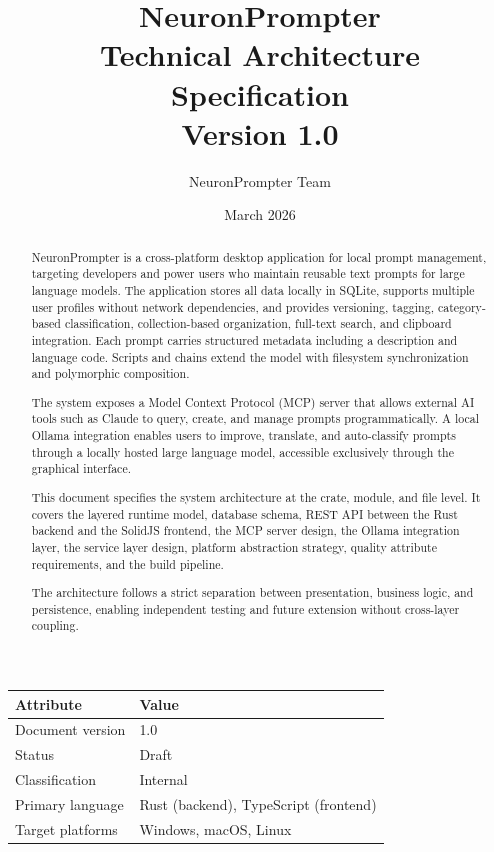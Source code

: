 \documentclass[a4paper, 11pt, oneside]{report}
\title{%
  \vspace{-1cm}
  {\Huge\bfseries NeuronPrompter}\\[0.5cm]
  {\Large Technical Architecture Specification}\\[0.3cm]
  {\large Version 1.0}
}
\author{NeuronPrompter Team}
\date{March 2026}
\begin{document}

\maketitle
\thispagestyle{empty}

\vfill
\begin{center}
\begin{tabular}{ll}
  \toprule
  \textbf{Attribute}  & \textbf{Value} \\
  \midrule
  Document version    & 1.0 \\
  Status              & Draft \\
  Classification      & Internal \\
  Primary language    & Rust (backend), TypeScript (frontend) \\
  Target platforms    & Windows, macOS, Linux \\
  \bottomrule
\end{tabular}
\end{center}
\vfill

\clearpage

\begin{abstract}
NeuronPrompter is a cross-platform desktop application for local prompt
management, targeting developers and power users who maintain reusable text
prompts for large language models.  The application stores all data locally
in SQLite, supports multiple user profiles without network dependencies,
and provides versioning, tagging, category-based classification,
collection-based organization, full-text search, and clipboard integration.
Each prompt carries structured metadata including a description and
language code.  Scripts and chains extend the model with filesystem
synchronization and polymorphic composition.

The system exposes a Model Context Protocol (MCP) server that allows
external AI tools such as Claude to query, create, and manage prompts
programmatically.  A local Ollama integration enables users to improve,
translate, and auto-classify prompts through a locally hosted large
language model, accessible exclusively through the graphical interface.

This document specifies the system architecture at the crate, module, and
file level.  It covers the layered runtime model, database schema, REST
API between the Rust backend and the SolidJS frontend, the MCP server
design, the Ollama integration layer, the service layer design, platform
abstraction strategy, quality attribute requirements, and the build
pipeline.

The architecture follows a strict separation between presentation, business
logic, and persistence, enabling independent testing and future extension
without cross-layer coupling.
\end{abstract}
\end{document}
